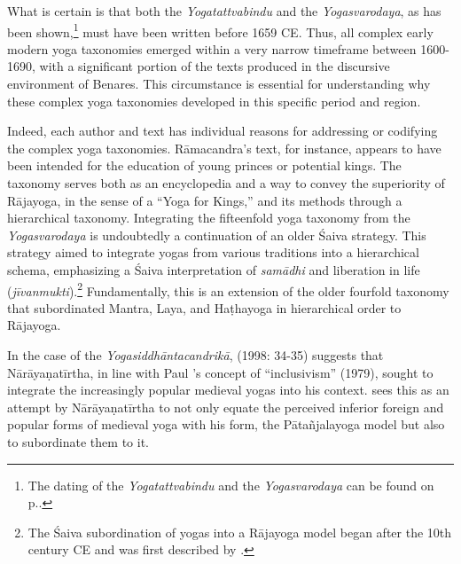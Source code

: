 What is certain is that both the \textit{Yogatattvabindu} and the \textit{Yogasvarodaya}, as has been shown,\footnote{The dating of the \textit{Yogatattvabindu} and the \textit{Yogasvarodaya} can be found on p.\pageref{datierung}.} must have been written before 1659 CE. Thus, all complex early modern yoga taxonomies emerged within a very narrow timeframe between 1600-1690, with a significant portion of the texts produced in the discursive environment of Benares. This circumstance is essential for understanding why these complex yoga taxonomies developed in this specific period and region.

Indeed, each author and text has individual reasons for addressing or codifying the complex yoga taxonomies. Rāmacandra's text, for instance, appears to have been intended for the education of young princes or potential kings. The taxonomy serves both as an encyclopedia and a way to convey the superiority of Rājayoga, in the sense of a ``Yoga for Kings,'' and its methods through a hierarchical taxonomy. Integrating the fifteenfold yoga taxonomy from the \textit{Yogasvarodaya} is undoubtedly a continuation of an older Śaiva strategy. This strategy aimed to integrate yogas from various traditions into a hierarchical schema, emphasizing a Śaiva interpretation of \textit{samādhi} and liberation in life (\textit{jīvanmukti}).\footnote{The Śaiva subordination of yogas into a Rājayoga model began after the 10th century CE and was first described by \citeauthor[2019]{birch2019}.} Fundamentally, this is an extension of the older fourfold taxonomy that subordinated Mantra, Laya, and Haṭhayoga in hierarchical order to Rājayoga.

In the case of the \textit{Yogasiddhāntacandrikā}, \citeauthor{endo1998} (1998: 34-35) suggests that Nārāyaṇatīrtha, in line with Paul \citeauthor{hacker1979}'s concept of ``inclusivism'' (1979), sought to integrate the increasingly popular medieval yogas into his context. \citeauthor{endo1998} sees this as an attempt by Nārāyaṇatīrtha to not only equate the perceived inferior foreign and popular forms of medieval yoga with his form, the Pātañjalayoga model but also to subordinate them to it.


